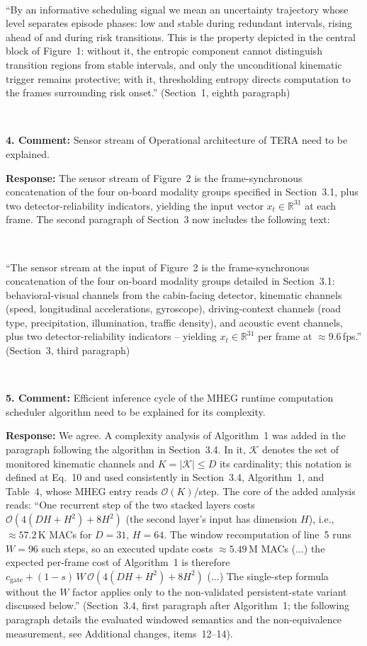 \documentclass[1p,12pt,authoryear]{elsarticle}
\begin{document}
~

``By an informative scheduling signal we mean an uncertainty trajectory whose level separates episode phases: low and stable during redundant intervals, rising ahead of and during risk transitions. This is the property depicted in the central block of Figure~1: without it, the entropic component cannot distinguish transition regions from stable intervals, and only the unconditional kinematic trigger remains protective; with it, thresholding entropy directs computation to the frames surrounding risk onset.'' (Section~1, eighth paragraph)

~

\noindent \textbf{4. Comment:} Sensor stream of Operational architecture of TERA need to be explained.

\vspace{2mm}
\noindent \textbf{Response:} The sensor stream of Figure~2 is the frame-synchronous concatenation of the four on-board modality groups specified in Section~3.1, plus two detector-reliability indicators, yielding the input vector $x_t \in \mathbb{R}^{31}$ at each frame. The second paragraph of Section~3 now includes the following text:

~

``The sensor stream at the input of Figure~2 is the frame-synchronous concatenation of the four on-board modality groups detailed in Section~3.1: behavioral-visual channels from the cabin-facing detector, kinematic channels (speed, longitudinal accelerations, gyroscope), driving-context channels (road type, precipitation, illumination, traffic density), and acoustic event channels, plus two detector-reliability indicators -- yielding $x_t \in \mathbb{R}^{31}$ per frame at $\approx$9.6\,fps.'' (Section~3, third paragraph)

~

\noindent \textbf{5. Comment:} Efficient inference cycle of the MHEG runtime computation scheduler algorithm need to be explained for its complexity.

\vspace{2mm}
\noindent \textbf{Response:} We agree. A complexity analysis of Algorithm~1 was added in the paragraph following the algorithm in Section~3.4. In it, $\mathcal{K}$ denotes the set of monitored kinematic channels and $K = |\mathcal{K}| \le D$ its cardinality; this notation is defined at Eq.~10 and used consistently in Section~3.4, Algorithm~1, and Table~4, whose MHEG entry reads $\mathcal{O}(K)$/step. The core of the added analysis reads: ``One recurrent step of the two stacked layers costs $\mathcal{O}(4(DH{+}H^2)+8H^2)$ (the second layer's input has dimension $H$), i.e., ${\approx}57.2$\,K MACs for $D{=}31$, $H{=}64$. The window recomputation of line~5 runs $W{=}96$ such steps, so an executed update costs ${\approx}5.49$\,M MACs (...) the expected per-frame cost of Algorithm~1 is therefore $c_{\mathrm{gate}} + (1-s)\,W\,\mathcal{O}(4(DH{+}H^2)+8H^2)$ (...) The single-step formula without the $W$ factor applies only to the non-validated persistent-state variant discussed below.'' (Section~3.4, first paragraph after Algorithm~1; the following paragraph details the evaluated windowed semantics and the non-equivalence measurement, see Additional changes, items~12--14).
\end{document}
